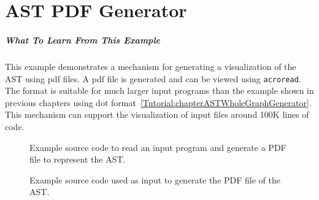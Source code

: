 \chapter{AST PDF Generator}
\label{Tutorial:chapter_AST_PDF_Generator}

\paragraph{What To Learn From This Example}
This example demonstrates a mechanism for generating a visualization
of the AST using pdf files.  A pdf file is generated and can be viewed 
using {\tt acroread}.  The format is suitable for much larger input 
programs than the example shown in previous chapters using dot
format~\ref{Tutorial:chapterASTWholeGraphGenerator}.
This mechanism can support the visualization of input files around 100K 
lines of code.

\begin{figure}[!h]
{\indent
{\mySmallFontSize


\begin{latexonly}
   
\end{latexonly}

\begin{htmlonly}
   
\end{htmlonly}

}
}
\caption{Example source code to read an input program and generate a PDF file to represent the AST.}
\label{Tutorial:exampleAST_PDF_Generator}
\end{figure}

\begin{figure}[!h]
{\indent
{\mySmallFontSize


\begin{latexonly}
   
\end{latexonly}

\begin{htmlonly}
   
\end{htmlonly}

}
}
\caption{Example source code used as input to generate the PDF file of the AST.}
\label{Tutorial:exampleInputCode_AST_PDF_Generator}
\end{figure}

